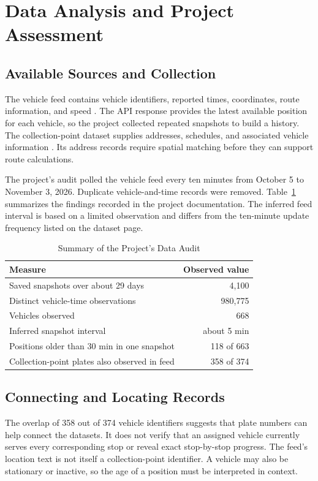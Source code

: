 \section{Data Analysis and Project Assessment}\label{sec:exp}
\subsection{Available Sources and Collection}
The vehicle feed contains vehicle identifiers, reported times, coordinates, route information, and speed \cite{dataset83558}. The API response provides the latest available position for each vehicle, so the project collected repeated snapshots to build a history. The collection-point dataset supplies addresses, schedules, and associated vehicle information \cite{dataset84004}. Its address records require spatial matching before they can support route calculations.

The project's audit polled the vehicle feed every ten minutes from October 5 to November 3, 2026. Duplicate vehicle-and-time records were removed. Table~\ref{tab:observations} summarizes the findings recorded in the project documentation. The inferred feed interval is based on a limited observation and differs from the ten-minute update frequency listed on the dataset page.

\begin{table}[htbp]
\caption{Summary of the Project's Data Audit}
\label{tab:observations}
\centering\footnotesize
\begin{tabular}{@{}p{}r@{}}
\toprule Measure & Observed value \\
\midrule
Saved snapshots over about 29 days & 4,100 \\
Distinct vehicle-time observations & 980,775 \\
Vehicles observed & 668 \\
Inferred snapshot interval & about 5 min \\
Positions older than 30 min in one snapshot & 118 of 663 \\
Collection-point plates also observed in feed & 358 of 374 \\
\bottomrule
\end{tabular}
\end{table}

\subsection{Connecting and Locating Records}
The overlap of 358 out of 374 vehicle identifiers suggests that plate numbers can help connect the datasets. It does not verify that an assigned vehicle currently serves every corresponding stop or reveal exact stop-by-stop progress. The feed's location text is not itself a collection-point identifier. A vehicle may also be stationary or inactive, so the age of a position must be interpreted in context.

